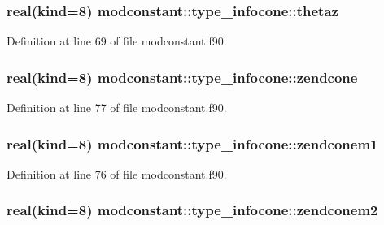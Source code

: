 \subsubsection[{\texorpdfstring{thetaz}{thetaz}}]{\setlength{\rightskip}{0pt plus 5cm}real(kind=8) modconstant\+::type\+\_\+infocone\+::thetaz}\hypertarget{structmodconstant_1_1type__infocone_adcd504c2ef07d2b86ede4b22fdf7d230}{}\label{structmodconstant_1_1type__infocone_adcd504c2ef07d2b86ede4b22fdf7d230}


Definition at line 69 of file modconstant.\+f90.

\subsubsection[{\texorpdfstring{zendcone}{zendcone}}]{\setlength{\rightskip}{0pt plus 5cm}real(kind=8) modconstant\+::type\+\_\+infocone\+::zendcone}\hypertarget{structmodconstant_1_1type__infocone_af14e8a4dfd266d20df12a5423fa5d498}{}\label{structmodconstant_1_1type__infocone_af14e8a4dfd266d20df12a5423fa5d498}


Definition at line 77 of file modconstant.\+f90.

\subsubsection[{\texorpdfstring{zendconem1}{zendconem1}}]{\setlength{\rightskip}{0pt plus 5cm}real(kind=8) modconstant\+::type\+\_\+infocone\+::zendconem1}\hypertarget{structmodconstant_1_1type__infocone_afa95773c4532988173a5acffd5e863b9}{}\label{structmodconstant_1_1type__infocone_afa95773c4532988173a5acffd5e863b9}


Definition at line 76 of file modconstant.\+f90.

\subsubsection[{\texorpdfstring{zendconem2}{zendconem2}}]{\setlength{\rightskip}{0pt plus 5cm}real(kind=8) modconstant\+::type\+\_\+infocone\+::zendconem2}\hypertarget{structmodconstant_1_1type__infocone_a25413fc9488146e4ba60e0736a7662de}{}\label{structmodconstant_1_1type__infocone_a25413fc9488146e4ba60e0736a7662de}



